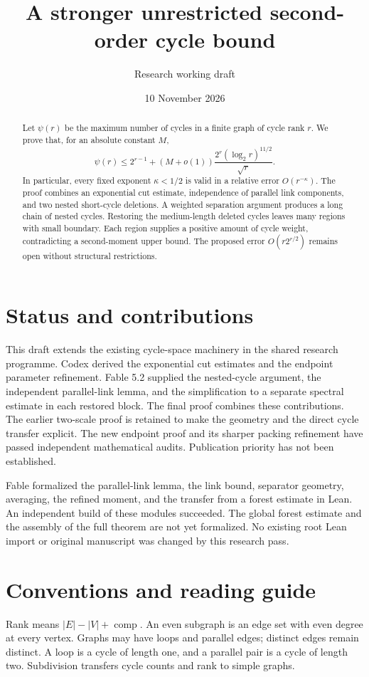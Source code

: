 \documentclass[11pt]{article}
\title{A stronger unrestricted second-order cycle bound}
\author{Research working draft}
\date{10 November 2026}
\begin{document}
\maketitle
\begin{abstract}
Let $\psi(r)$ be the maximum number of cycles in a finite graph of cycle rank $r$.
We prove that, for an absolute constant $M$,
\[
 \psi(r)\le2^{r-1}+(M+o(1))\frac{2^r(\log_2 r)^{11/2}}{\sqrt r}.
\]
In particular, every fixed exponent $\kappa<1/2$ is valid in a relative error $O(r^{-\kappa})$.
The proof combines an exponential cut estimate, independence of parallel link components, and two nested short-cycle deletions.
A weighted separation argument produces a long chain of nested cycles.
Restoring the medium-length deleted cycles leaves many regions with small boundary.
Each region supplies a positive amount of cycle weight, contradicting a second-moment upper bound.
The proposed error $O(r2^{r/2})$ remains open without structural restrictions.
\end{abstract}

\section*{Status and contributions}
This draft extends the existing cycle-space machinery in the shared research programme.
Codex derived the exponential cut estimates and the endpoint parameter refinement.
Fable 5.2 supplied the nested-cycle argument, the independent parallel-link lemma, and the simplification to a separate spectral estimate in each restored block.
The final proof combines these contributions.
The earlier two-scale proof is retained to make the geometry and the direct cycle transfer explicit.
The new endpoint proof and its sharper packing refinement have passed independent mathematical audits.
Publication priority has not been established.

Fable formalized the parallel-link lemma, the link bound, separator geometry, averaging, the refined moment, and the transfer from a forest estimate in Lean.
An independent build of these modules succeeded.
The global forest estimate and the assembly of the full theorem are not yet formalized.
No existing root Lean import or original manuscript was changed by this research pass.

\section*{Conventions and reading guide}
Rank means $|E|-|V|+\operatorname{comp}$.
An even subgraph is an edge set with even degree at every vertex.
Graphs may have loops and parallel edges; distinct edges remain distinct.
A loop is a cycle of length one, and a parallel pair is a cycle of length two.
Subdivision transfers cycle counts and rank to simple graphs.
\end{document}
